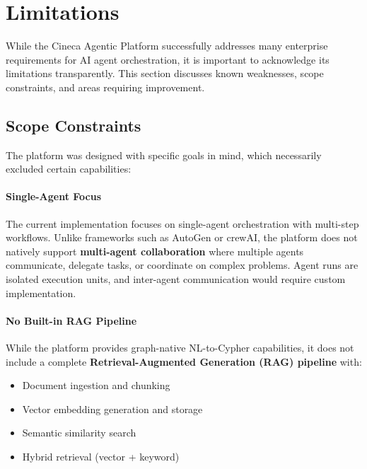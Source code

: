 
\section{Limitations}
\label{sec:limitations}

While the Cineca Agentic Platform successfully addresses many enterprise requirements for AI agent orchestration, it is important to acknowledge its limitations transparently. This section discusses known weaknesses, scope constraints, and areas requiring improvement.

\subsection{Scope Constraints}

The platform was designed with specific goals in mind, which necessarily excluded certain capabilities:

\paragraph{Single-Agent Focus}
The current implementation focuses on single-agent orchestration with multi-step workflows. Unlike frameworks such as AutoGen or crewAI, the platform does not natively support \textbf{multi-agent collaboration} where multiple agents communicate, delegate tasks, or coordinate on complex problems. Agent runs are isolated execution units, and inter-agent communication would require custom implementation.

\paragraph{No Built-in RAG Pipeline}
While the platform provides graph-native NL-to-Cypher capabilities, it does not include a complete \textbf{Retrieval-Augmented Generation (RAG) pipeline} with:
\begin{itemize}
    \item Document ingestion and chunking
    \item Vector embedding generation and storage
    \item Semantic similarity search
    \item Hybrid retrieval (vector + keyword)
\end{itemize}

